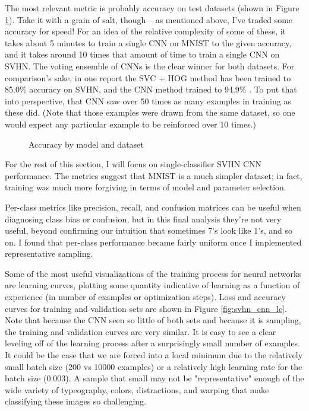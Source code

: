 \documentclass{article}
\begin{document}
The most relevant metric is probably accuracy on test datasets (shown in Figure \ref{fig:accuracy}). Take it with a grain of salt, though -- as mentioned above, I've traded some accuracy for speed! For an idea of the relative complexity of some of these, it takes about 5 minutes to train a single CNN on MNIST to the given accuracy, and it takes around 10 times that amount of time to train a single CNN on SVHN. The voting ensemble of CNNs is the clear winner for both datasets. For comparison's sake, in one report the SVC + HOG method has been trained to 85.0\% accuracy on SVHN, and the CNN method trained to 94.9\% \cite{sermanet2012convolutional}. To put that into perspective, that CNN saw over 50 times as many examples in training as these did. (Note that those examples were drawn from the same dataset, so one would expect any particular example to be reinforced over 10 times.)

\begin{figure}[htbp]
\centering
{}
\caption{Accuracy by model and dataset}
\label{fig:accuracy}
\end{figure}

For the rest of this section, I will focus on single-classifier SVHN CNN performance. The metrics suggest that MNIST is a much simpler dataset; in fact, training was much more forgiving in terms of model and parameter selection.

Per-class metrics like precision, recall, and confusion matrices can be useful when diagnosing class bias or confusion, but in this final analysis they're not very useful, beyond confirming our intuition that sometimes 7's look like 1's, and so on. I found that per-class performance became fairly uniform once I implemented representative sampling.

Some of the most useful visualizations of the training process for neural networks are learning curves, plotting some quantity indicative of learning as a function of experience (in number of examples or optimization steps). Loss and accuracy curves for training and validation sets are shown in Figure \ref{fig:svhn_cnn_lc}. Note that because the CNN seen so little of both sets and because it is sampling, the training and validation curves are very similar. It is easy to see a clear leveling off of the learning process after a surprisingly small number of examples. It could be the case that we are forced into a local minimum due to the relatively small batch size (200 vs 10000 examples) or a relatively high learning rate for the batch size (0.003). A sample that small may not be "representative" enough of the wide variety of typeography, colors, distractions, and warping that make classifying these images so challenging.
\end{document}

